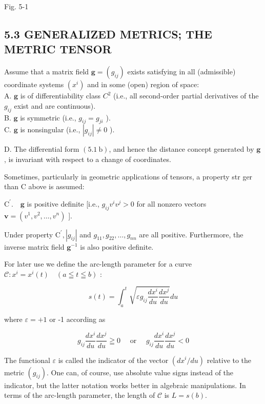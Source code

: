 \documentclass[10pt]{article}
\begin{document}
Fig. 5-1

\subsection*{5.3 GENERALIZED METRICS; THE METRIC TENSOR}
Assume that a matrix field $\mathbf{g}=\left(g_{i j}\right)$ exists satisfying in all (admissible) coordinate systems $\left(x^{i}\right)$ and in some (open) region of space:\\
A. $\mathbf{g}$ is of differentiability class $C^{2}$ (i.e., all second-order partial derivatives of the $g_{i j}$ exist and are continuous).\\
B. $\mathbf{g}$ is symmetric (i.e., $g_{i j}=g_{j i}$ ).\\
C. $\mathbf{g}$ is nonsingular (i.e., $\left|g_{i j}\right| \neq 0$ ).

D. The differential form $(5.1 \mathrm{~b})$, and hence the distance concept generated by $\mathbf{g}$, is invariant with respect to a change of coordinates.

Sometimes, particularly in geometric applications of tensors, a property str ger than $\mathrm{C}$ above is assumed:

$\mathrm{C}^{\prime} . \quad \mathbf{g}$ is positive definite [i.e., $g_{i j} v^{i} v^{j}>0$ for all nonzero vectors $\mathbf{v}=\left(v^{1}, v^{2}, \ldots, v^{n}\right)$ ].

Under property $\mathrm{C}^{\prime},\left|g_{i j}\right|$ and $g_{11}, g_{22}, \ldots, g_{n n}$ are all positive. Furthermore, the inverse matrix field $\mathbf{g}^{-1}$ is also positive definite.

For later use we define the arc-length parameter for a curve $\mathscr{C}: x^{i}=x^{i}(t) \quad(a \leqq t \leqq b)$ :


\begin{equation*}
s(t)=\int_{a}^{t} \sqrt{\varepsilon g_{i j} \frac{d x^{i}}{d u} \frac{d x^{j}}{d u}} d u \tag{5.6a}
\end{equation*}


where $\varepsilon=+1$ or -1 according as

$$
g_{i j} \frac{d x^{i}}{d u} \frac{d x^{j}}{d u} \geqq 0 \quad \text { or } \quad g_{i j} \frac{d x^{i}}{d u} \frac{d x^{j}}{d u}<0
$$

The functional $\varepsilon$ is called the indicator of the vector $\left(d x^{i} / d u\right)$ relative to the metric $\left(g_{i j}\right)$. One can, of course, use absolute value signs instead of the indicator, but the latter notation works better in algebraic manipulations. In terms of the arc-length parameter, the length of $\mathscr{C}$ is $L=s(b)$.
\end{document}

